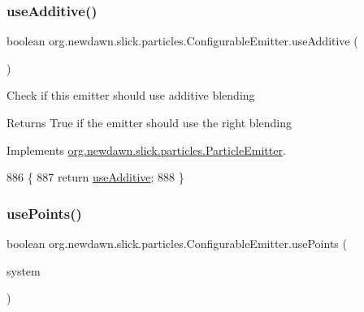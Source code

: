 \subsubsection{\texorpdfstring{use\+Additive()}{useAdditive()}}
{\footnotesize\ttfamily boolean org.\+newdawn.\+slick.\+particles.\+Configurable\+Emitter.\+use\+Additive (\begin{DoxyParamCaption}{ }\end{DoxyParamCaption})\hspace{0.3cm}{\ttfamily [inline]}}

Check if this emitter should use additive blending

\begin{DoxyReturn}{Returns}
True if the emitter should use the right blending 
\end{DoxyReturn}


Implements \mbox{\hyperlink{interfaceorg_1_1newdawn_1_1slick_1_1particles_1_1_particle_emitter_a36f6bfeef5567c7c5b42c866a738cdb7}{org.\+newdawn.\+slick.\+particles.\+Particle\+Emitter}}.


\begin{DoxyCode}
886                                  \{
887         \textcolor{keywordflow}{return} \mbox{\hyperlink{classorg_1_1newdawn_1_1slick_1_1particles_1_1_configurable_emitter_a417f9091bafd99eaed6984b22190b798}{useAdditive}};
888     \}
\end{DoxyCode}
\mbox{\label{classorg_1_1newdawn_1_1slick_1_1particles_1_1_configurable_emitter_a8034277f8d85d47a5460665c5212d351}} 
\subsubsection{\texorpdfstring{use\+Points()}{usePoints()}}
{\footnotesize\ttfamily boolean org.\+newdawn.\+slick.\+particles.\+Configurable\+Emitter.\+use\+Points (\begin{DoxyParamCaption}\item[{\mbox{\hyperlink{classorg_1_1newdawn_1_1slick_1_1particles_1_1_particle_system}{Particle\+System}}}]{system }\end{DoxyParamCaption})\hspace{0.3cm}{\ttfamily [inline]}}

